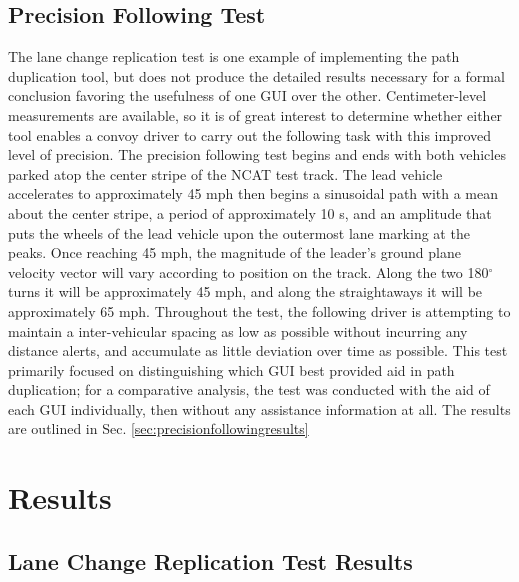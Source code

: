 \subsection{Precision Following Test} \label{sec:targetspacingtest}
The lane change replication test is one example of implementing the path duplication tool, but does not produce the detailed results necessary for a formal conclusion favoring the usefulness of one GUI over the other. Centimeter-level measurements are available, so it is of great interest to determine whether either tool enables a convoy driver to carry out the following task with this improved level of precision. The precision following test begins and ends with both vehicles parked atop the center stripe of the NCAT test track. The lead vehicle accelerates to approximately 45 mph then begins a sinusoidal path with a mean about the center stripe, a period of approximately 10 s, and an amplitude that puts the wheels of the lead vehicle upon the outermost lane marking at the peaks. Once reaching 45 mph, the magnitude of the leader's ground plane velocity vector will vary according to position on the track. Along the two 180$^\circ$ turns it will be approximately 45 mph, and along the straightaways it will be approximately 65 mph. Throughout the test, the following driver is attempting to maintain a inter-vehicular spacing as low as possible without incurring any distance alerts, and accumulate as little deviation over time as possible. 
This test primarily focused on distinguishing which GUI best provided aid in path duplication; for a comparative analysis, the test was conducted with the aid of each GUI individually, then without any assistance information at all. The results are outlined in Sec. \ref{sec:precisionfollowingresults}

\subsection{}


\section{Results} \label{sec:results}

\subsection{Lane Change Replication Test Results} \label{sec:lanechangetestresults}

